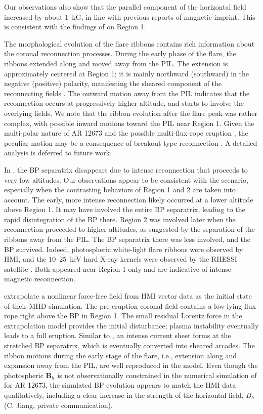 \documentclass[times,twocolumn]{aastex631}
\begin{document}
\begin{CJK*}{UTF8}{gbsn}
Our observations also show that the parallel component of the horizontal field increased by about $1$~kG, in line with previous reports of magnetic imprint. This is consistent with the findings of \citet{petrie2019} on Region 1.

The morphological evolution of the flare ribbons contains rich information about the coronal reconnection processes. During the early phase of the flare, the ribbons extended along and moved away from the PIL. The extension is approximately centered at Region 1; it is mainly northward (southward) in the negative (positive) polarity, manifesting the sheared component of the reconnecting fields \citep{qiu2009}. The outward motion away from the PIL indicates that the reconnection occurs at progressively higher altitude, and starts to involve the overlying fields. We note that the ribbon evolution after the flare peak was rather complex, with possible inward motions toward the PIL near Region 1. Given the multi-polar nature of AR 12673 and the possible multi-flux-rope eruption \citep{hou2018}, the peculiar motion may be a consequence of breakout-type reconnection \citep[e.g.,][]{lynch2013,dahlin2019}. A detailed analysis is deferred to future work.

In \citet{fan2007}, the BP separatrix disappears due to intense reconnection that proceeds to very low altitudes. Our observations appear to be consistent with the scenario, especially when the contrasting behaviors of Region 1 and 2 are taken into account. The early, more intense reconnection likely occurred at a lower altitude above Region 1. It may have involved the entire BP separatrix, leading to the rapid disintegration of the BP there. Region 2 was involved later when the reconnection proceeded to higher altitudes, as suggested by the separation of the ribbons away from the PIL. The BP separatrix there was less involved, and the BP survived. Indeed, photospheric white-light flare ribbons were observed by HMI, and the $10$--$25$~keV hard X-ray kernels were observed by the RHESSI satellite \citep{yangsh2017,romano2019}. Both appeared near Region 1 only and are indicative of intense magnetic reconnection.

\citet{jiang2018} extrapolate a nonlinear force-free field from HMI vector data as the initial state of their MHD simulation. The pre-eruption coronal field contains a low-lying flux rope right above the BP in Region 1. The small residual Lorentz force in the extrapolation model provides the initial disturbance; plasma instability eventually leads to a full eruption. Similar to \citet{fan2007}, an intense current sheet forms at the stretched BP separatrix, which is eventually converted into sheared arcades. The ribbon motions during the early stage of the flare, i.e., extension along and expansion away from the PIL, are well reproduced in the model. Even though the photospheric $\bm{B}_h$ is not observationally constrained in the numerical simulation of \citet{jiang2018} for AR 12673, the simulated BP evolution appears to match the HMI data qualitatively, including a clear increase in the strength of the horizontal field, $B_h$ (C. Jiang, private communication).


\end{CJK*}
\end{document}
